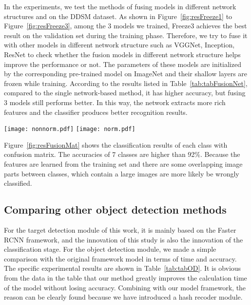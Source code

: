 In the experiments, we test the methods of 
fusing models in different network structures 
and on the DDSM dataset. As shown in 
Figure~\ref{fig:resFreeze1} to 
Figure~\ref{fig:resFreeze3}, 
among the 3 models we trained, Freeze3 
achieves the best result on the validation set 
during the training phase. Therefore, we try 
to fuse it with other models in different 
network structure such as VGGNet, Inception,
ResNet to check whether the fusion models 
in different network structure helps improve 
the performance or not. The parameters of 
these models are initialized by the 
corresponding pre-trained model on ImageNet 
and their shallow layers are frozen while 
training. According to the results listed in
Table~\ref{tab:tabFusionNet}, 
compared to the single network-based method, 
it has higher accuracy, but fusing 3 models 
still performs better. In this way, the 
network extracts more rich features and the 
classifier produces better recognition 
results.

\begin{figure*}[!ht]
    \centering
    \texttt{[image: nonnorm.pdf]}
    \texttt{[image: norm.pdf]}
    \caption{Confusion matrices produced by the 
        fusion model on the test set.}
    \label{fig:resFusionMat}
\end{figure*}

Figure~\ref{fig:resFusionMat} 
shows the classification results of each 
class with confusion matrix. The accuracies 
of 7 classes are higher than 92$\%$. Because 
the features are learned from the training 
set and there are some overlapping image 
parts between classes, which contain a large 
images are more likely be wrongly classified.

\subsection{Comparing other object detection methods}
\label{ExpCD}

For the target detection module of this 
work, it is mainly based on the Faster RCNN 
framework, and the innovation of this study 
is also the innovation of the classification 
stage. For the object detection module, we 
made a simple comparison with the original 
framework model in terms of time and 
accuracy. The specific experimental results 
are shown in 
Table~\ref{tab:tabOD}. 
It is obvious from the data in the table 
that our method greatly improves the 
calculation time of the model without 
losing accuracy. Combining with our model 
framework, the reason can be clearly found 
because we have introduced a hash recoder 
module.


